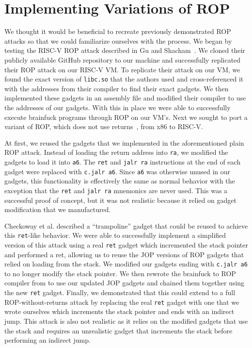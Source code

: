 \section{Implementing Variations of ROP}

We thought it would be beneficial to recreate previously demonstrated ROP attacks
so that we could familiarize ourselves with the process. We began by testing the
RISC-V ROP attack described in Gu and Shacham~\cite{gu20ropriscv}. We cloned
their publicly available GitHub repository to our machine and successfully
replicated their ROP attack on our RISC-V VM. To replicate their attack on our VM, we
found the exact version of \verb|libc.so| that the authors used and cross-referenced
it with the addresses from their compiler to find their exact gadgets. We then
implemented these gadgets in an assembly file and modified their compiler to use
the addresses of our gadgets. With this in place we were able to successfully execute
brainfuck programs through ROP on our VM's. Next we sought to port a variant of
ROP, which does not use returns~\cite{checkoway10ropnoret}, from x86 to RISC-V.

At first, we reused the gadgets that we implemented in the aforementioned plain ROP
attack. Instead of loading the return address into \verb|ra|, we modified the
gadgets to load it into \verb|a6|. The \verb|ret| and \verb|jalr ra|
instructions at the end of each gadget were replaced with \verb|c.jalr a6|.
Since \verb|a6| was otherwise unused in our gadgets, this functionality is
effectively the same as normal behavior with the exception that the \verb|ret|
and \verb|jalr ra| mnemonics are never used. This was a successful proof of
concept, but it was not realistic because it relied on gadget modification that
we manufactured.

Checkoway et al. described a ``trampoline'' gadget that could be reused to
achieve this \verb|ret|-like behavior. We were able to successfully implement
a simplified version of this attack using a real \verb|ret| gadget which incremented
the stack pointer and performed a ret, allowing us to reuse the JOP versions of ROP gadgets that
relied on loading from the stack. We modified our gadgets ending with \verb|c.jalr a6|
to no longer modify the stack pointer. We then rewrote the brainfuck to ROP compiler
from \cite{gu20ropriscv} to use our updated JOP gadgets and chained them together
using the new \verb|ret| gadget. Finally, we demonstrated that this could extend to a
full ROP-without-returns attack by replacing the real \verb|ret| gadget with one
that we wrote ourselves which increments the stack pointer and ends with an indirect jump.
This attack is also not realistic as it relies on the modified gadgets that use the stack
and requires an unrealistic gadget that increments the stack before performing an indirect jump.

